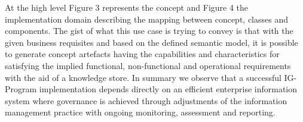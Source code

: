 \documentclass[a4paper,twoside]{article}
\begin{document}
At the high level Figure 3 represents the concept and  Figure 4  the implementation domain describing the mapping between concept, classes and components. The gist of what this use case is trying to convey is that with the given business requisites and based on the defined semantic model, it is possible to generate concept artefacts having the capabilities and characteristics for satisfying the implied functional, non-functional and operational requirements with the aid of a knowledge store. 
In summary we observe that a successful IG-Program implementation depends directly on an efficient enterprise information system where governance is achieved through adjustments of the information management practice with ongoing monitoring, assessment and reporting.
% 
%
\end{document}
